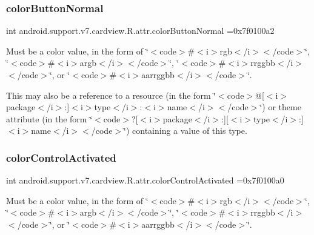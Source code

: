 \subsubsection{\texorpdfstring{color\+Button\+Normal}{colorButtonNormal}}
{\footnotesize\ttfamily int android.\+support.\+v7.\+cardview.\+R.\+attr.\+color\+Button\+Normal =0x7f0100a2\hspace{0.3cm}{\ttfamily [static]}}

Must be a color value, in the form of \char`\"{}$<$code$>$\#$<$i$>$rgb$<$/i$>$$<$/code$>$\char`\"{}, \char`\"{}$<$code$>$\#$<$i$>$argb$<$/i$>$$<$/code$>$\char`\"{}, \char`\"{}$<$code$>$\#$<$i$>$rrggbb$<$/i$>$$<$/code$>$\char`\"{}, or \char`\"{}$<$code$>$\#$<$i$>$aarrggbb$<$/i$>$$<$/code$>$\char`\"{}. 

This may also be a reference to a resource (in the form \char`\"{}$<$code$>$@\mbox{[}$<$i$>$package$<$/i$>$\+:\mbox{]}$<$i$>$type$<$/i$>$\+:$<$i$>$name$<$/i$>$$<$/code$>$\char`\"{}) or theme attribute (in the form \char`\"{}$<$code$>$?\mbox{[}$<$i$>$package$<$/i$>$\+:\mbox{]}\mbox{[}$<$i$>$type$<$/i$>$\+:\mbox{]}$<$i$>$name$<$/i$>$$<$/code$>$\char`\"{}) containing a value of this type. \mbox{\label{classandroid_1_1support_1_1v7_1_1cardview_1_1R_1_1attr_a59fd03e0a464d197160b8c11316cc56a}} 
\subsubsection{\texorpdfstring{color\+Control\+Activated}{colorControlActivated}}
{\footnotesize\ttfamily int android.\+support.\+v7.\+cardview.\+R.\+attr.\+color\+Control\+Activated =0x7f0100a0\hspace{0.3cm}{\ttfamily [static]}}

Must be a color value, in the form of \char`\"{}$<$code$>$\#$<$i$>$rgb$<$/i$>$$<$/code$>$\char`\"{}, \char`\"{}$<$code$>$\#$<$i$>$argb$<$/i$>$$<$/code$>$\char`\"{}, \char`\"{}$<$code$>$\#$<$i$>$rrggbb$<$/i$>$$<$/code$>$\char`\"{}, or \char`\"{}$<$code$>$\#$<$i$>$aarrggbb$<$/i$>$$<$/code$>$\char`\"{}. 

